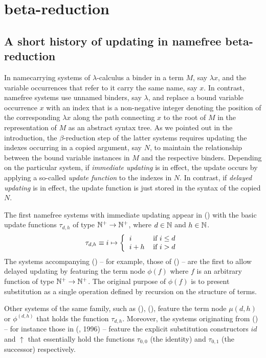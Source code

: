 \documentclass[submission,copyright,creativecommons]{eptcs}
\begin{document}
\section{beta-reduction}
\label{SecBet}





\subsection{A short history of updating in namefree beta-reduction}\label{SecSho}

In namecarrying systems of $\lambda$-calculus
a binder in a term $M$, say $\lambda x$, and the variable occurrences
that refer to it carry the same name, say $x$.
 In contrast, namefree systems use unnamed binders, say $\lambda$,
and replace a bound variable occurrence $x$
with an index that is a non-negative integer denoting the position of
the corresponding $\lambda x$ along the path connecting $x$ to the
root of $M$ in the representation of $M$ as an abstract syntax tree.
As we pointed out in the introduction,
the $\beta$-reduction step of the latter systems
requires updating the indexes occurring in a copied
argument, say $N$, to maintain the relationship between the bound variable
instances in $M$ and the respective binders.
Depending on the particular system,
if {\em immediate updating\/} is in effect, the update occurs by
applying a so-called {\em update function\/} to the indexes in $N$. In contrast, if {\em delayed updating\/} is in effect, the update function
is just stored in the syntax of the copied $N$.

The first namefree systems with immediate updating appear in (\cite{deB72})
with the basic update functions $\tau_{d,h}$ of type $\mathbb{N}^+ \to \mathbb{N}^+$,
where $d\in\mathbb{N}$ and $h\in\mathbb{N}$.
\[
\tau_{d,h} \equiv i \mapsto
\left\{\begin{tabular}{ll}
$i$&if $i \le d$\\
$i+h$&if $i > d$\\
\end{tabular}\right.
\]
The systems accompanying (\cite{deB78b})
-- for example, those of (\cite{deB77,deB78a}) --
are the first to allow delayed updating
by featuring the term node $\phi(f)$
where $f$ is an arbitrary function of type $\mathbb{N}^+ \to \mathbb{N}^+$. The original purpose of $\phi(f)$ is to present substitution as a single operation defined by recursion on the structure of terms.


Other systems of the same family, such as (\cite{Ned79,Ned80}), (\cite{KN93}),
feature the term node $\mu(d,h)$ or $\phi^{(d,h)}$
that holds the function $\tau_{d,h}$.
Moreover, the systems originating from (\cite{Aba91})
-- for instance those in (\cite{CHL96}, 1996) --
feature the explicit substitution constructors $\mathit{id}$ and $\uparrow$
that essentially hold the functions $\tau_{0,0}$ (the identity)
and $\tau_{0,1}$ (the successor) respectively.
\end{document}
